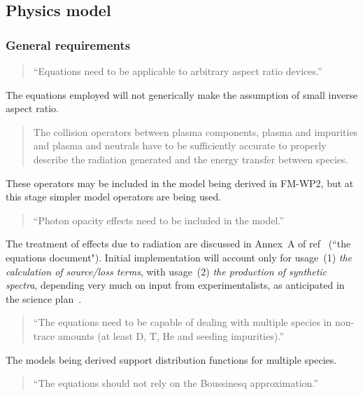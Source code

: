 \subsection{Physics model}
\label{sec:physics_model}

\subsubsection{General requirements}

\begin{quote}
``Equations need to be applicable to arbitrary aspect ratio devices.''
\end{quote}

The equations employed will not generically make the assumption of small
inverse aspect ratio.

\begin{quote}
The collision operators between plasma components, plasma and
impurities and plasma and neutrals have to be sufficiently accurate to properly
describe the radiation generated and the energy transfer between species.
\end{quote}

These operators may be included in the model being
derived in FM-WP2, but at this stage simpler model operators are being used.

\begin{quote}
``Photon opacity effects need to be included in the model.''
\end{quote}

The treatment of effects due to radiation are discussed in Annex~A of ref~\cite{pappeqs2}
(``the equations document"). Initial implementation will account only for
usage~(1) \emph{the calculation of source/loss terms}, with usage~(2) \emph{the production
of synthetic spectra}, depending very much on input from experimentalists,
as anticipated in the science plan~\cite[p\.\,11]{sciplan}.

\begin{quote}
``The equations need to be capable of dealing with multiple species in
non-trace amounts (at least D, T, He and seeding impurities).''
\end{quote}

The models being derived support distribution functions for multiple species.

\begin{quote}
``The equations should not rely on the Boussinesq approximation.''
\end{quote}

